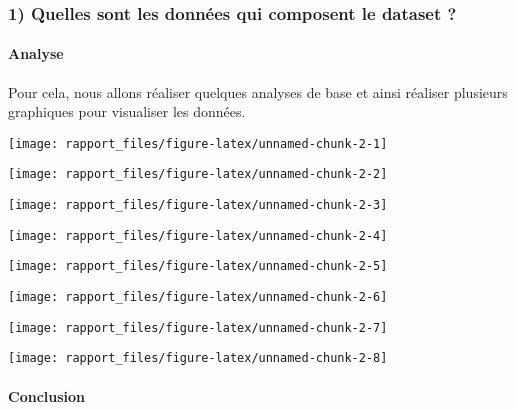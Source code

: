 \documentclass[
]{article}
\begin{document}
\hypertarget{quelles-sont-les-donnuxe9es-qui-composent-le-dataset}{%
\subsubsection{1) Quelles sont les données qui composent le dataset
?}\label{quelles-sont-les-donnuxe9es-qui-composent-le-dataset}}

\hypertarget{analyse-1}{%
\paragraph{\texorpdfstring{\textbf{Analyse}}{Analyse}}\label{analyse-1}}

Pour cela, nous allons réaliser quelques analyses de base et ainsi
réaliser plusieurs graphiques pour visualiser les données.

\begin{center}\texttt{[image: rapport\_files/figure-latex/unnamed-chunk-2-1]} \end{center}

\begin{center}\texttt{[image: rapport\_files/figure-latex/unnamed-chunk-2-2]} \end{center}

\begin{center}\texttt{[image: rapport\_files/figure-latex/unnamed-chunk-2-3]} \end{center}

\begin{center}\texttt{[image: rapport\_files/figure-latex/unnamed-chunk-2-4]} \end{center}

\begin{center}\texttt{[image: rapport\_files/figure-latex/unnamed-chunk-2-5]} \end{center}

\begin{center}\texttt{[image: rapport\_files/figure-latex/unnamed-chunk-2-6]} \end{center}

\begin{center}\texttt{[image: rapport\_files/figure-latex/unnamed-chunk-2-7]} \end{center}

\begin{center}\texttt{[image: rapport\_files/figure-latex/unnamed-chunk-2-8]} \end{center}

\hypertarget{conclusion}{%
\paragraph{\texorpdfstring{\textbf{Conclusion}}{Conclusion}}\label{conclusion}}
\end{document}
